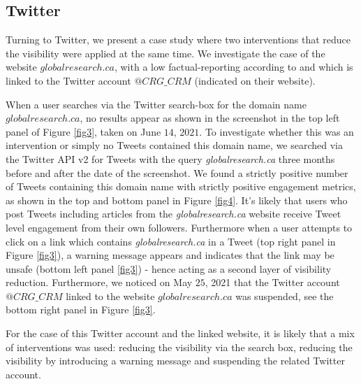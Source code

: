 \documentclass[Afour,sageh,times]{sagej}
\begin{document}
\subsection{Twitter}  \label{globalresearch}

Turning to Twitter, we present a case study where two interventions that reduce the visibility were applied at the same time. We investigate the case of the website $globalresearch.ca$, with a low factual-reporting according to \cite{MBFCgloabalresearch} and which is linked to the Twitter account {$@CRG\_CRM$} (indicated on their website). 

When a user searches via the Twitter search-box for the domain name $globalresearch.ca$, no results appear as shown in the screenshot in the top left panel of Figure \ref{fig3}, taken on June $14$, $2021$. To investigate whether this was an intervention or simply no Tweets contained this domain name, we searched via the Twitter API v2 for Tweets with the query {\it globalresearch.ca} three months before and after the date of the screenshot. We found a strictly positive number of Tweets containing this domain name with strictly positive engagement metrics, as shown in the top and bottom panel in Figure \ref{fig4}. It's likely that users who post Tweets including articles from the {\it globalresearch.ca} website receive Tweet level engagement from their own followers. Furthermore when a user attempts to click on a link which contains {\it globalresearch.ca} in a Tweet (top right panel in Figure \ref{fig3}), a warning message appears and indicates that the link may be unsafe (bottom left panel \ref{fig3}) - hence acting as a second layer of visibility reduction. Furthermore, we noticed on May $25$, 2021 that the Twitter account {$@CRG\_CRM$} linked to the website $globalresearch.ca$ was suspended, see the bottom right panel in Figure \ref{fig3}. 

For the case of this Twitter account and the linked website, it is likely that a mix of interventions was used: reducing the visibility via the search box, reducing the visibility by introducing a warning message and suspending the related Twitter account.  
\end{document}
